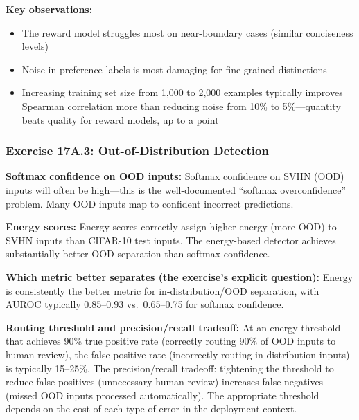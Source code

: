 \textbf{Key observations:}
\begin{itemize}
    \item The reward model struggles most on near-boundary cases (similar conciseness levels)
    \item Noise in preference labels is most damaging for fine-grained distinctions
    \item Increasing training set size from 1,000 to 2,000 examples typically improves Spearman correlation more than reducing noise from 10\% to 5\%---quantity beats quality for reward models, up to a point
\end{itemize}

\subsubsection*{Exercise 17A.3: Out-of-Distribution Detection}

\textbf{Softmax confidence on OOD inputs:} Softmax confidence on SVHN (OOD) inputs will often be high---this is the well-documented ``softmax overconfidence'' problem. Many OOD inputs map to confident incorrect predictions.

\textbf{Energy scores:} Energy scores correctly assign higher energy (more OOD) to SVHN inputs than CIFAR-10 test inputs. The energy-based detector achieves substantially better OOD separation than softmax confidence.

\textbf{Which metric better separates (the exercise's explicit question):} Energy is consistently the better metric for in-distribution/OOD separation, with AUROC typically 0.85--0.93 vs.\ 0.65--0.75 for softmax confidence.

\textbf{Routing threshold and precision/recall tradeoff:} At an energy threshold that achieves 90\% true positive rate (correctly routing 90\% of OOD inputs to human review), the false positive rate (incorrectly routing in-distribution inputs) is typically 15--25\%. The precision/recall tradeoff: tightening the threshold to reduce false positives (unnecessary human review) increases false negatives (missed OOD inputs processed automatically). The appropriate threshold depends on the cost of each type of error in the deployment context.
